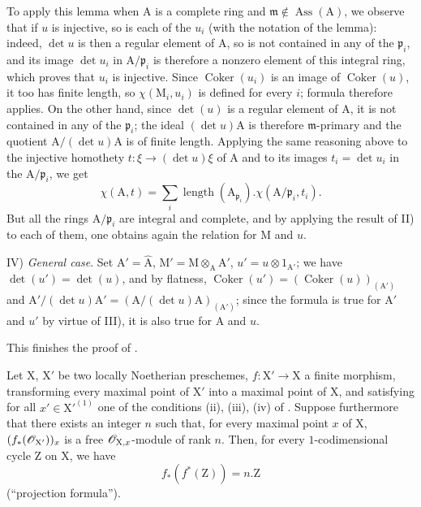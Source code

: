 To apply this lemma when $\mathrm{A}$ is a complete ring and $\mathfrak{m}\notin\operatorname{Ass}(\mathrm{A})$, we observe that if $u$ is injective, so is each of the $u_i$ (with the notation of the lemma): indeed, $\det u$ is then a regular element of $\mathrm{A}$, so is not contained in any of the $\mathfrak{p}_i$, and its image $\det u_i$ in $\mathrm{A}/\mathfrak{p}_i$ is therefore a nonzero element of this integral ring, which proves that $u_i$ is injective.
Since $\operatorname{Coker}(u_i)$ is an image of $\operatorname{Coker}(u)$, it too has finite length, so $\chi(\mathrm{M}_i,u_i)$ is defined for every $i$; formula  therefore applies.
On the other hand, since $\det(u)$ is a regular element of $\mathrm{A}$, it is not contained in any of the $\mathfrak{p}_i$; the ideal $(\det u)\mathrm{A}$ is therefore $\mathfrak{m}$-primary and the quotient $\mathrm{A}/(\det u)\mathrm{A}$ is of finite length.
Applying the same reasoning above to the injective homothety $t:\xi\to(\det u)\xi$ of $\mathrm{A}$ and to its images $t_i=\det u_i$ in the $\mathrm{A}/\mathfrak{p}_i$, we get
\[
  \chi(\mathrm{A},t)=\sum_i\operatorname{length}(\mathrm{A}_{\mathfrak{p}_i}).\chi(\mathrm{A}/\mathfrak{p}_i,t_i).
\]
But all the rings $\mathrm{A}/\mathfrak{p}_i$ are integral and complete, and by applying the result of II) to each of them, one obtains again the relation  for $\mathrm{M}$ and $u$.

IV) \emph{General case}.
Set $\mathrm{A}'=\widehat{\mathrm{A}}$, $\mathrm{M}'=\mathrm{M}\otimes_{\mathrm{A}}\mathrm{A}'$, $u'=u\otimes 1_{\mathrm{A}'}$; we have $\det(u')=\det(u)$, and by flatness, $\operatorname{Coker}(u')=(\operatorname{Coker}(u))_{(\mathrm{A}')}$ and $\mathrm{A}'/(\det u)\mathrm{A}'=(\mathrm{A}/(\det u)\mathrm{A})_{(\mathrm{A}')}$; since the formula  is true for $\mathrm{A}'$ and $u'$ by virtue of III), it is also true for $\mathrm{A}$ and $u$.

This finishes the proof of .

\begin{proposition}[21.10.18]
\label{IV.21.10.18}
Let $\mathrm{X}$, $\mathrm{X}'$ be two locally Noetherian preschemes, $f:\mathrm{X}'\to\mathrm{X}$ a finite morphism, transforming every maximal point of $\mathrm{X}'$ into a maximal point of $\mathrm{X}$, and satisfying for all $x'\in\mathrm{X}'^{(1)}$ one of the conditions \textup{(ii), (iii), (iv)} of .
Suppose furthermore that there exists an integer $n$ such that, for every maximal point $x$ of $\mathrm{X}$, $(f_*(\mathscr{O}_{\mathrm{X}'}))_x$ is a free $\mathscr{O}_{\mathrm{X},x}$-module of rank $n$.
Then, for every $1$-codimensional cycle $\mathrm{Z}$ on $\mathrm{X}$, we have
\[
\label{IV.21.10.18.1}
  f_*(f^*(\mathrm{Z}))=n.\mathrm{Z}
  \tag{21.10.18.1}
\]
\textup{(``projection formula'')}.
\end{proposition}


